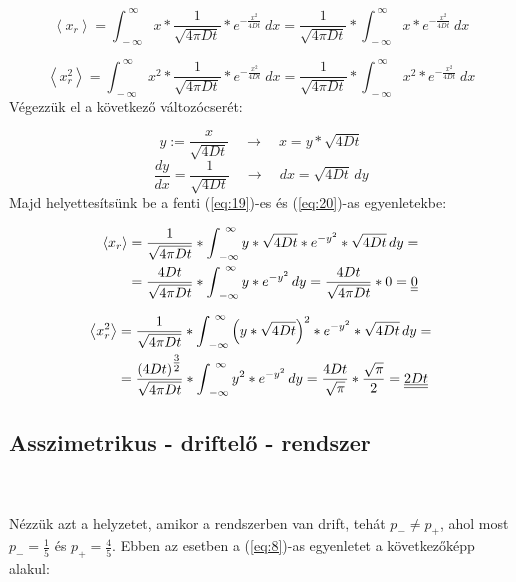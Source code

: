 \begin{equation} \label{eq:19}
    \left< x_{r} \right>
    =
    \int_{\ -\infty}^{\ \infty} x * \frac{1}{\sqrt{4 \pi D t}} * e^{-\tfrac{x^{2}}{4Dt}}\ dx
    =
    \frac{1}{\sqrt{4 \pi D t}} * \int_{\ -\infty}^{\ \infty} x * e^{-\tfrac{x^{2}}{4Dt}}\ dx
\end{equation}

\begin{equation} \label{eq:20}
    \left< x_{r}^{2} \right>
    =
    \int_{\ -\infty}^{\ \infty} x^{2} * \frac{1}{\sqrt{4 \pi D t}} * e^{-\tfrac{x^{2}}{4Dt}}\ dx
    =
    \frac{1}{\sqrt{4 \pi D t}} * \int_{\ -\infty}^{\ \infty} x^{2} * e^{-\tfrac{x^{2}}{4Dt}}\ dx
\end{equation}
Végezzük el a következő változócserét:

\begin{equation*}
    y := \frac{x}{\sqrt{4Dt}} \quad \to \quad x = y * \sqrt{4Dt}
\end{equation*}
\begin{equation*}
    \frac{dy}{dx} = \frac{1}{\sqrt{4Dt}} \quad \to \quad dx = \sqrt{4Dt}\, dy
\end{equation*}
Majd helyettesítsünk be a fenti (\ref{eq:19})-es és (\ref{eq:20})-as egyenletekbe:

\begin{align} \label{eq:21}
    \left< x_{r} \right>
    &=
    \frac{1}{\sqrt{4 \pi D t}} * \int_{\ -\infty}^{\ \infty} y * \sqrt{4Dt} * e^{-y^{2}} * \sqrt{4Dt}\, dy = \nonumber \\
    &=
    \frac{4Dt}{\sqrt{4 \pi D t}} * \int_{\ -\infty}^{\ \infty} y * e^{-y^{2}}\, dy
    =
    \frac{4Dt}{\sqrt{4 \pi D t}} * 0 = \underline{\underline{0}}
\end{align}

\begin{align} \label{eq:22}
    \left< x_{r}^{2} \right>
    &=
    \frac{1}{\sqrt{4 \pi D t}} * \int_{\ -\infty}^{\ \infty} \left( y * \sqrt{4Dt} \right)^{2} * e^{-y^{2}} * \sqrt{4Dt}\, dy = \nonumber \\
    &=
    \frac{\left( 4Dt \right)^{\tfrac{3}{2}}}{\sqrt{4 \pi D t}} * \int_{\ -\infty}^{\ \infty} y^{2} * e^{-y^{2}}\, dy
    =
    \frac{4Dt}{\sqrt{\pi}} * \frac{\sqrt{\pi}}{2}
    =
    \doubleunderline{2Dt}
\end{align}

\subsection{Asszimetrikus - driftelő - rendszer} \label{subsec:3.2}
\\ \\
Nézzük azt a helyzetet, amikor a rendszerben van drift, tehát $p_{-} \neq p_{+}$, ahol most $p_{-} = \frac{1}{5}$ és $p_{+} = \frac{4}{5}$. Ebben az esetben a (\ref{eq:8})-as egyenletet a következőképp alakul:

